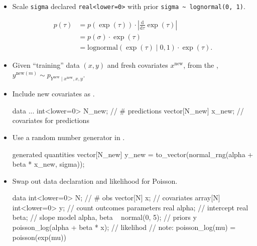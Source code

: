 \documentclass[10pt]{report}
\begin{document}
\begin{itemize}
\item Scale \texttt{sigma} declared \texttt{real<lower=0>} with
  prior \Verb|sigma ~ lognormal(0, 1)|.
{\small
\vspace*{-4pt}
\begin{align*}
p(\tau)
&= p(\exp(\tau))
   \cdot \left| \frac{\textrm{d}}{\textrm{d}\tau} \exp(\tau) \right|
\\[4pt] &= p(\sigma) \cdot \exp(\tau)
\\[4pt] &= \textrm{lognormal}(\exp(\tau) \mid 0, 1) \cdot \exp(\tau).
\end{align*}
}
\end{itemize}

%
\begin{itemize}
\item Given ``training'' data $(x, y)$ and fresh covariates $x^\textrm{new}$, 
    from the , 
  $y^{\textrm{new}(m)} \sim p_{Y^\textrm{new} \mid x^\textrm{new}, x, y}$.
\item Include new covariates as .
\begin{stancode}  
data {
  ...
  int<lower=0> N_new;     // # predictions
  vector[N_new] x_new;    // covariates for predictions
}
\end{stancode}
\item Use a random number generator in .
\begin{stancode}
generated quantities {
  vector[N_new] y_new = to_vector(normal_rng(alpha + beta * x_new, sigma));
}  
\end{stancode}
\end{itemize}

\begin{itemize}
\item Swap out data declaration and likelihood for Poisson.
\begin{stancode}
data {
  int<lower=0> N;                       // # obs
  vector[N] x;                          // covariates
  array[N] int<lower=0> y;              // count outcomes
}
parameters {
  real alpha;                           // intercept
  real beta;                            // slope
}
model {
  { alpha, beta } ~ normal(0, 5);       // priors
  y ~ poisson_log(alpha + beta * x);    // likelihod
  // note: poisson_log(mu) = poisson(exp(mu))
}  
\end{stancode}
\end{itemize}
\end{document}
